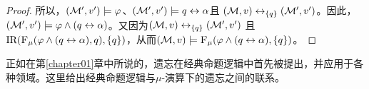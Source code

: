 \begin{proof}
	所以，$({\cal M}',v') \models \varphi$、$({\cal M}',v') \models q\leftrightarrow \alpha$且
	$({\cal M},v)\leftrightarrow_{\{q\}}({\cal M}',v')$。因此，$({\cal M}',v') \models \varphi \wedge (q\leftrightarrow\alpha)$。又因为$({\cal M},v)\leftrightarrow_{\{q\}}({\cal M}',v')$ 且$\textrm{IR}({\textsc{F}_{\textsc{$\mu$}}} (\varphi \wedge (q\leftrightarrow\alpha), q), \{q\})$，从而$({\cal M},v) \models {\textsc{F}_{\textsc{$\mu$}}} (\varphi \wedge (q\leftrightarrow\alpha), \{q\})$。
\end{proof}


正如在第\ref{chapter01}章中所说的，遗忘在经典命题逻辑中首先被提出，并应用于各种领域。这里给出经典命题逻辑与$\mu$-演算下的遗忘之间的联系。

